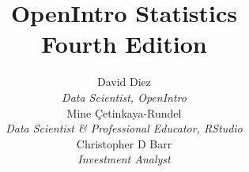 
\title{\huge OpenIntro Statistics\vspace{1.5mm} \\
    \Large Fourth Edition}
\author{David Diez \\
\small\emph{Data Scientist, OpenIntro} \\[6mm]
Mine \c{C}etinkaya-Rundel \\
\small\emph{Data Scientist \& Professional Educator, RStudio} \\[6mm]
Christopher D Barr \\
\small\emph{Investment Analyst} \\
}
